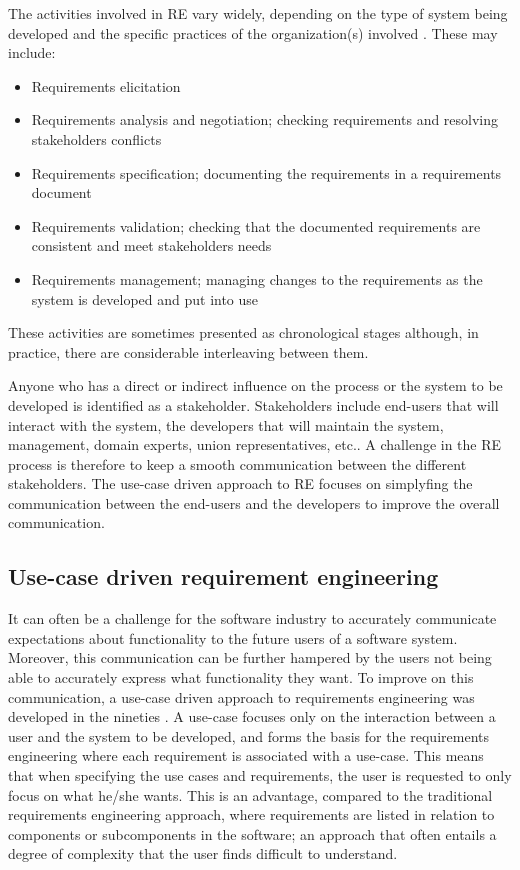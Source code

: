 The activities involved in RE vary widely, depending on the type of system being developed and the specific practices of the organization(s) involved  \cite{Som11}.  These may include:
\begin{itemize}
\item Requirements elicitation 
\item Requirements analysis and negotiation; checking requirements and resolving stakeholders conflicts
\item Requirements specification; documenting the requirements in a requirements document
\item Requirements validation; checking that the documented requirements are consistent and meet stakeholders needs
\item Requirements management; managing changes to the requirements as the system is developed and put into use
\end{itemize}

These activities are sometimes presented as chronological stages although, in practice, there  are considerable interleaving between them.  

Anyone who has a direct or indirect influence on the process or the system to be developed is identified as a stakeholder.   Stakeholders include end-users that will interact with the system, the developers that will maintain the system, management, domain experts, union representatives, etc..  A challenge in the RE process is therefore to keep a smooth communication between the different stakeholders.  The use-case driven approach to RE focuses on simplyfing the communication between the end-users and the developers to improve the overall communication.

\subsection{Use-case driven requirement engineering}
\label{sec:use-case-driven}
It can often be a challenge for the software industry to accurately communicate expectations about functionality to the
future users of a software system. Moreover, this communication can be further hampered by the users not
being able to accurately express what functionality they want. To improve on this communication, a use-case driven
approach to requirements engineering was developed in the
nineties  \cite{Jac92,Poh10,Coc01}.  A use-case focuses only on the interaction between a user and the system to be
developed, and forms the basis for the requirements engineering where each requirement is
associated with a use-case. This means that when specifying the use cases and requirements, the user is requested to only focus on what he/she wants.  This is an
advantage, compared to the traditional requirements engineering approach, where requirements are listed in relation to
components or subcomponents in
the software; an approach that often entails a degree of complexity that the user finds difficult to understand.  

